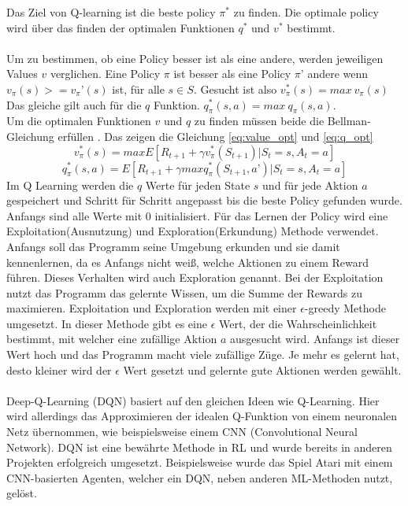 Das Ziel von Q-learning ist die beste policy $\pi^*$ zu finden. Die optimale policy wird über das finden der optimalen Funktionen $q^*$ und $v^*$ bestimmt. 
\\\\
Um zu bestimmen, ob eine Policy besser ist als eine andere, werden jeweiligen Values $v$ verglichen. Eine Policy $\pi$ ist besser als eine Policy $\pi’$ andere wenn $v_\pi(s) >= v_\pi’(s)$ ist, für alle $s \in S$. 
Gesucht ist also $v_\pi^*(s)=max\ v_\pi(s)$
Das gleiche gilt auch für die $q$ Funktion.
$q_\pi^*(s,a) = max\ q_\pi(s,a)$.
\\
Um die optimalen Funktionen $v$ und $q$ zu finden müssen beide die Bellman-Gleichung erfüllen . Das zeigen die Gleichung \ref{eq:value_opt} und \ref{eq:q_opt}
\begin{equation}\label{eq:value_opt}
v_\pi^*(s) = max E[R_{t+1}+ \gamma{}v_\pi^*(S_{t+1})|S_t= s, A_t=a]
\end{equation}
\begin{equation}\label{eq:q_opt}
q_\pi^*(s,a) = E[R_{t+1} + \gamma{}maxq_\pi^*(S_{t+1},a’)|S_t= s, A_t=a] 
\end{equation}
Im Q Learning werden die $q$ Werte für jeden State $s$ und für jede Aktion $a$ gespeichert und Schritt für Schritt angepasst bis die beste Policy gefunden wurde. Anfangs sind alle Werte mit 0 initialisiert.
Für das Lernen der Policy wird eine Exploitation(Ausnutzung) und Exploration(Erkundung) Methode verwendet. Anfangs soll das Programm seine Umgebung erkunden und sie damit kennenlernen, da es Anfangs nicht weiß, welche Aktionen zu einem Reward führen. Dieses Verhalten wird auch Exploration genannt. Bei der Exploitation nutzt das Programm das gelernte Wissen, um die Summe der Rewards zu maximieren. 
Exploitation und Exploration werden mit einer $\epsilon$-greedy Methode umgesetzt.
In dieser Methode gibt es eine $\epsilon$ Wert, der die Wahrscheinlichkeit bestimmt, mit welcher eine zufällige Aktion $a$ ausgesucht wird. Anfangs ist dieser Wert hoch und das Programm macht viele zufällige Züge. Je mehr es gelernt hat, desto kleiner wird der $\epsilon$ Wert gesetzt und gelernte gute Aktionen werden gewählt.
\\\\
Deep-Q-Learning (DQN)  basiert auf den gleichen Ideen wie Q-Learning. Hier wird allerdings das Approximieren der idealen Q-Funktion von einem neuronalen Netz übernommen, wie beispielsweise einem CNN (Convolutional Neural Network).
DQN ist eine bewährte Methode in RL und wurde bereits in anderen Projekten erfolgreich umgesetzt. Beispielsweise wurde das Spiel Atari mit einem CNN-basierten Agenten, welcher ein DQN, neben anderen ML-Methoden nutzt, gelöst.  


